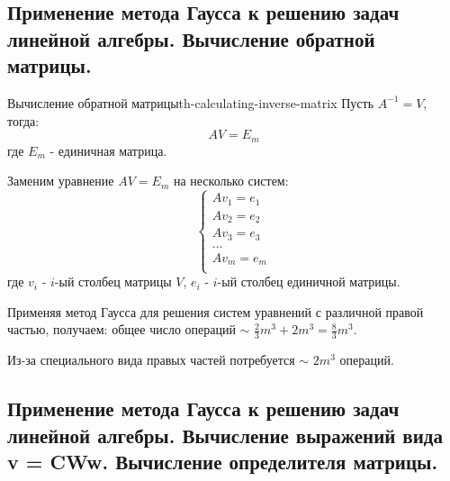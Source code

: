 \documentclass[14pt]{extarticle}
\begin{document}
\clearpage
\subsection{Применение метода Гаусса к решению задач линейной алгебры. Вычисление обратной матрицы.}

    \begin{theorem}{Вычисление обратной матрицы}{th-calculating-inverse-matrix}
        Пусть $A^{-1} = V$, тогда:
        $$AV = E_{m}$$
        где $E_{m}$ - единичная матрица.

        \vspace{\baselineskip}

        Заменим уравнение $AV = E_{m}$ на несколько систем:
        $$
        \begin{cases} 
            Av_{1} = e_{1} \\
            Av_{2} = e_{2} \\
            Av_{3} = e_{3} \\
            \ldots \\
            Av_{m} = e_{m} \\
        \end{cases}
        $$
        где $v_{i}$ - $i$-ый столбец матрицы $V$, $e_{i}$ - $i$-ый столбец единичной матрицы.

        \vspace{\baselineskip}

        Применяя метод Гаусса для решения систем уравнений с различной правой частью, получаем: общее число операций $\sim$ $\frac{2}{3}m^{3} + 2m^{3} = \frac{8}{3}m^{3}$. 
        
        \vspace{\baselineskip}
        
        Из-за специального вида правых частей потребуется $\sim$ $2m^{3}$ операций.
    \end{theorem}

\clearpage
\subsection{Применение метода Гаусса к решению задач линейной алгебры. Вычисление выражений вида v = CWw. Вычисление определителя матрицы.}
\end{document}
